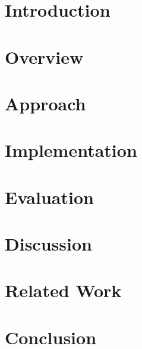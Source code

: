 
\section{Introduction}
    \label{sec:intro}
    

\section{Overview}
    \label{sec:overall}
    

\section{Approach}
    \label{sec:approaches}
    

\section{Implementation
}
    \label{sec:implementations}
    

\section{Evaluation}
    \label{sec:evaluation}
    

\section{Discussion}
    \label{sec:risk}
    

\section{Related Work}
    \label{sec:related_works}
    

\section{Conclusion}
    \label{sec:conclusion}
    